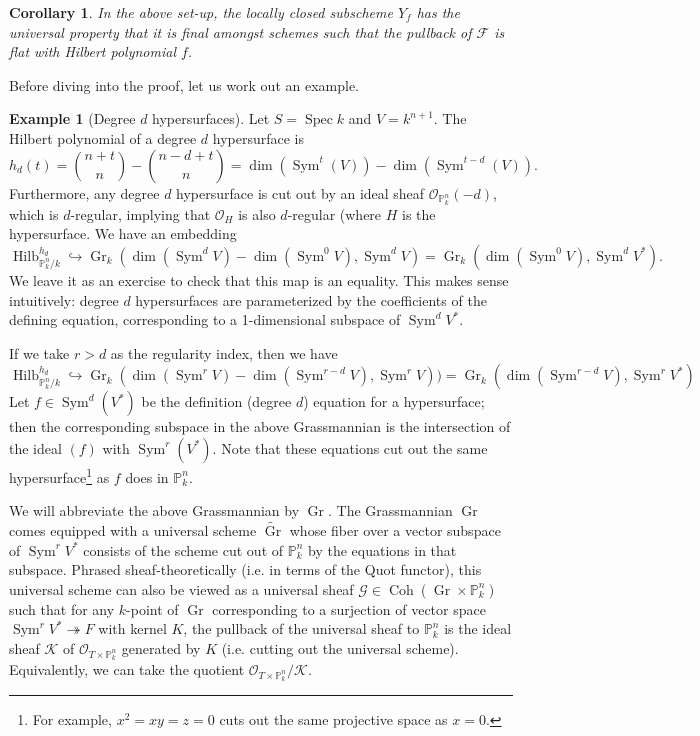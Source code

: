 \documentclass[10pt]{article}
\newtheorem{cor}[thm]{Corollary}
\theoremstyle{definition}
\newtheorem{exmp}[thm]{Example}
\DeclareMathOperator{\Coh}{Coh}
\DeclareMathOperator{\Spec}{Spec}
\DeclareMathOperator{\Sym}{Sym}
\DeclareMathOperator{\Hilb}{Hilb}
\newcommand{\PP}{\mathbb{P}}
\DeclareMathOperator{\Gr}{Gr}
\newcommand{\OO}{\mathcal{O}}
\begin{document}
\begin{cor}
In the above set-up, the locally closed subscheme $Y_f$ has the universal property that it is final amongst schemes such that the pullback of $\mathcal{F}$ is flat with Hilbert polynomial $f$.
\end{cor}

Before diving into the proof, let us work out an example.

\begin{exmp}[Degree $d$ hypersurfaces]
Let $S = \Spec k$ and $V = k^{n+1}$.  The Hilbert polynomial of a degree $d$ hypersurface is
$$h_d(t) = \binom{n+t}{n} - \binom{n-d+t}{n} = \dim(\Sym^t(V)) - \dim(\Sym^{t-d}(V)).$$
Furthermore, any degree $d$ hypersurface is cut out by an ideal sheaf $\OO_{\PP^n_k}(-d)$, which is $d$-regular, implying that $\OO_H$ is also $d$-regular (where $H$ is the hypersurface.  We have an embedding
$$\Hilb^{h_d}_{\PP^n_k/k} \hookrightarrow \Gr_k(\dim(\Sym^dV) - \dim(\Sym^0V), \Sym^dV) = \Gr_k(\dim(\Sym^0 V), \Sym^dV^*).$$
We leave it as an exercise to check that this map is an equality.  This makes sense intuitively: degree $d$ hypersurfaces are parameterized by the coefficients of the defining equation, corresponding to a 1-dimensional subspace of $\Sym^dV^*$.

If we take $r > d$ as the regularity index, then we have
$$\Hilb^{h_d}_{\PP^n_k/k} \hookrightarrow \Gr_k(\dim(\Sym^{r}V) - \dim(\Sym^{r-d}V), \Sym^rV)) = \Gr_k(\dim(\Sym^{r-d}V), \Sym^rV^*)$$
Let $f \in \Sym^d(V^*)$ be the definition (degree $d$) equation for a hypersurface; then the corresponding subspace in the above Grassmannian is the intersection of the ideal $(f)$ with $\Sym^r(V^*)$.  Note that these equations cut out the same hypersurface\footnote{For example, $x^2 = xy = z = 0$ cuts out the same projective space as $x = 0$.} as $f$ does in $\PP^n_k$.

We will abbreviate the above Grassmannian by $\Gr$.  The Grassmannian $\Gr$ comes equipped with a universal scheme $\widetilde{\Gr}$ whose fiber over a vector subspace of $\Sym^rV^*$ consists of the scheme cut out of $\PP^n_k$ by the equations in that subspace.  Phrased sheaf-theoretically (i.e. in terms of the Quot functor), this universal scheme can also be viewed as a universal sheaf $\mathcal{G} \in \Coh(\Gr \times \PP^n_k)$ such that for any $k$-point of $\Gr$ corresponding to a surjection of vector space $\Sym^rV^* \twoheadrightarrow F$ with kernel $K$, the pullback of the universal sheaf to $\PP^n_k$ is the ideal sheaf $\mathcal{K}$ of $\OO_{T \times \PP^n_k}$ generated by $K$ (i.e. cutting out the universal scheme).  Equivalently, we can take the quotient $\OO_{T \times \PP^n_k}/\mathcal{K}$.


\end{exmp}
\end{document}
